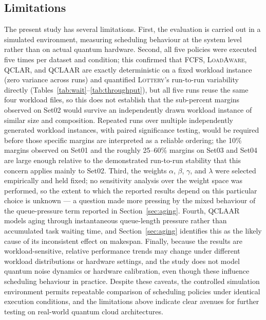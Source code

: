 \documentclass[preprint,12pt]{elsarticle}
\newcommand{\QCLAR}{\textsc{QCLAR}}
\newcommand{\QCLAAR}{\textsc{QCLAAR}}
\newcommand{\LoadAware}{\textsc{LoadAware}}
\newcommand{\FCFS}{\textsc{FCFS}}
\newcommand{\Lottery}{\textsc{Lottery}}
\begin{document}
\subsection{Limitations}
\label{sec:limitations}
The present study has several limitations. First, the evaluation is carried out
in a simulated environment, measuring scheduling behaviour at the system level
rather than on actual quantum hardware. Second, all five policies were executed
five times per dataset and condition; this confirmed that \FCFS{}, \LoadAware{},
\QCLAR{}, and \QCLAAR{} are exactly deterministic on a fixed workload instance
(zero variance across runs) and quantified \Lottery{}'s run-to-run variability
directly (Tables~\ref{tab:wait}--\ref{tab:throughput}), but all five runs reuse
the same four workload files, so this does not establish that the sub-percent
margins observed on Set02 would survive an independently drawn workload instance
of similar size and composition. Repeated runs over multiple independently
generated workload instances, with paired significance testing, would be
required before those specific margins are interpreted as a reliable ordering;
the 10\% margins observed on Set01 and the roughly 25--60\% margins on Set03 and
Set04 are large enough relative to the demonstrated run-to-run stability that
this concern applies mainly to Set02. Third, the weights $\alpha$, $\beta$,
$\gamma$, and $\lambda$ were selected empirically and held fixed; no sensitivity
analysis over the weight space was performed, so the extent to which the
reported results depend on this particular choice is unknown --- a question made
more pressing by the mixed behaviour of the queue-pressure term reported in
Section~\ref{sec:aging}. Fourth, \QCLAAR{} models aging through instantaneous
queue-length pressure rather than accumulated task waiting time, and
Section~\ref{sec:aging} identifies this as the likely cause of its inconsistent
effect on makespan. Finally, because the results are workload-sensitive,
relative performance trends may change under different workload distributions or
hardware settings, and the study does not model quantum noise dynamics or
hardware calibration, even though these influence scheduling behaviour in
practice. Despite these caveats, the controlled simulation environment permits
repeatable comparison of scheduling policies under identical execution
conditions, and the limitations above indicate clear avenues for further
testing on real-world quantum cloud architectures.

\end{document}
